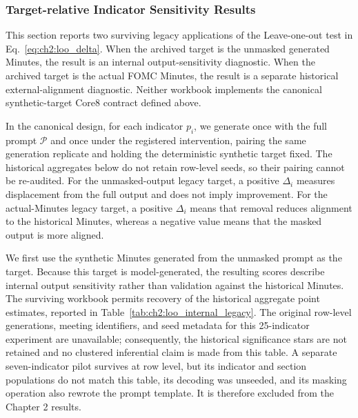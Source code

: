 
\fi
\subsubsection*{Target-relative Indicator Sensitivity Results}

This section reports two surviving legacy applications of the Leave-one-out
test in Eq.~\ref{eq:ch2:loo_delta}. When the archived target is the unmasked
generated Minutes, the result is an internal output-sensitivity diagnostic.
When the archived target is the actual FOMC Minutes, the result is a separate
historical external-alignment diagnostic. Neither workbook implements the
canonical synthetic-target Core8 contract defined above.



In the canonical design, for each indicator $p_i$, we generate once with the
full prompt $\mathcal{P}$ and once under the registered intervention, pairing
the same generation replicate and holding the deterministic synthetic target
fixed. The historical aggregates below do not retain row-level seeds, so their
pairing cannot be re-audited. For the unmasked-output legacy target, a positive
$\Delta_i$ measures displacement from the full output and does not imply
improvement. For the actual-Minutes legacy target, a positive $\Delta_i$ means
that removal reduces alignment to the historical Minutes, whereas a negative
value means that the masked output is more aligned.

We first use the synthetic Minutes generated from the unmasked prompt as the
target. Because this target is model-generated, the resulting scores describe
internal output sensitivity rather than validation against the historical
Minutes. The surviving workbook permits recovery of the historical aggregate
point estimates, reported in
Table~\ref{tab:ch2:loo_internal_legacy}. The original row-level generations,
meeting identifiers, and seed metadata for this 25-indicator experiment are
unavailable; consequently, the historical significance stars are not
retained and no clustered inferential claim is made from this table. A
separate seven-indicator pilot survives at row level, but its indicator and
section populations do not match this table, its decoding was unseeded, and
its masking operation also rewrote the prompt template. It is therefore
excluded from the Chapter 2 results.

